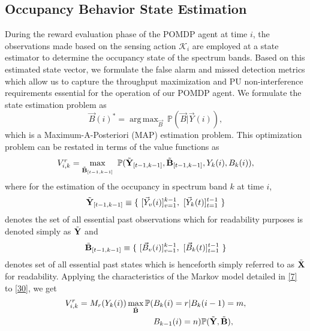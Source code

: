 \documentclass[10pt,twocolumn]{IEEEtran}
\DeclareMathOperator*{\argmax}{arg\,max}
\begin{document}
\subsection{Occupancy Behavior State Estimation}
During the reward evaluation phase of the POMDP agent at time $i$, the observations made based on the sensing action $\mathcal{K}_i$ are employed at a state estimator to determine the occupancy state of the spectrum bands. Based on this estimated state vector, we formulate the false alarm and missed detection metrics which allow us to capture the throughput maximization and PU non-interference requirements essential for the operation of our POMDP agent. We formulate the state estimation problem as
\begin{equation}\label{29}
    \vec{B}(i)^* = \argmax_{\vec{B}}\ \mathbb{P}(\vec{B}|\vec{Y}(i)),
\end{equation}
which is a Maximum-A-Posteriori (MAP) estimation problem. This optimization problem can be restated in terms of the value functions as
\begin{equation}\label{30}
    V_{i,k}^{r} = \max_{\Tilde{\textbf{B}}_{[t-1,k-1]}}\ \mathbb{P}(\Tilde{\textbf{Y}}_{[t-1,k-1]},\Tilde{\textbf{B}}_{[t-1,k-1]},Y_k(i),B_k(i)),
\end{equation}
where for the estimation of the occupancy in spectrum band $k$ at time $i$, 
\begin{equation}\label{31}
    \Tilde{\textbf{Y}}_{[t-1,k-1]} \equiv \{\ [\vec{Y}_v(i)]_{v=1}^{k-1},\ [\vec{Y}_k(t)]_{t=1}^{t-1}\ \}
\end{equation}
denotes the set of all essential past observations which for readability purposes is denoted simply as $\Tilde{\textbf{Y}}$ and
\begin{equation}\label{32}
    \Tilde{\textbf{B}}_{[t-1,k-1]} \equiv \{\ [\vec{B}_v(i)]_{v=1}^{k-1},\ [\vec{B}_k(t)]_{t=1}^{t-1}\ \}
\end{equation}
denotes set of all essential past states which is henceforth simply referred to as $\Tilde{\textbf{X}}$ for readability. Applying the characteristics of the Markov model detailed in \eqref{7} to \eqref{30}, we get
\begin{equation}\label{33}
    \begin{aligned}
        V_{i,k}^{r} = M_r(Y_k(i))\max_{\Tilde{\textbf{B}}}\mathbb{P}(&B_k(i)=r|B_{k}(i-1)=m,\\
        &B_{k-1}(i)=n)\mathbb{P}(\Tilde{\textbf{Y}},\Tilde{\textbf{B}}),
    \end{aligned}
\end{equation}
\end{document}
